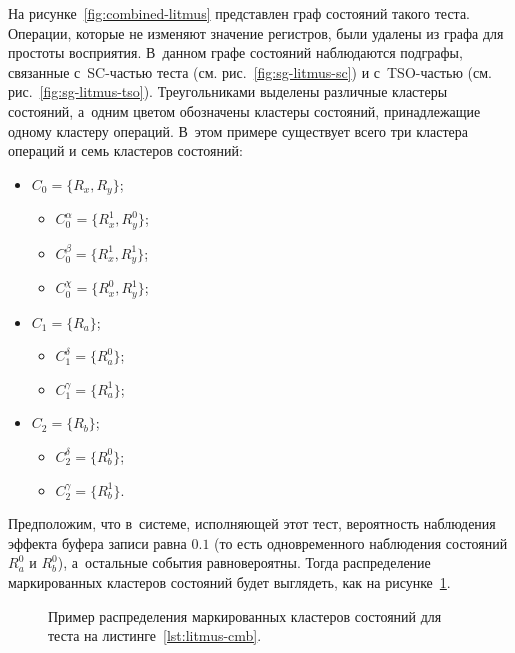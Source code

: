 На рисунке~\ref{fig:combined-litmus} представлен граф состояний
такого теста. Операции, которые не изменяют значение регистров, были
удалены из графа для простоты восприятия. В~данном графе состояний
наблюдаются подграфы, связанные с~SC-частью теста (см.
рис.~\ref{fig:sg-litmus-sc}) и с~TSO-частью (см.
рис.~\ref{fig:sg-litmus-tso}). Треугольниками выделены различные
кластеры состояний, а~одним цветом обозначены кластеры состояний,
принадлежащие одному кластеру операций. В~этом примере существует
всего три кластера операций и семь кластеров состояний:
\begin{samepage}
  \begin{itemize}
    \item $C_0 = \{R_x, R_y\}$;
      \begin{itemize}
        \item $C_0^{\alpha} = \{R_x^1, R_y^0\}$;
        \item $C_0^{\beta} = \{R_x^1, R_y^1\}$;
        \item $C_0^{\chi} = \{R_x^0, R_y^1\}$;
      \end{itemize}
    \item $C_1 = \{R_a\}$;
      \begin{itemize}
        \item $C_1^{\delta} = \{R_a^0\}$;
        \item $C_1^{\gamma} = \{R_a^1\}$;
      \end{itemize}
    \item $C_2 = \{R_b\}$;
      \begin{itemize}
        \item $C_2^{\delta} = \{R_b^0\}$;
        \item $C_2^{\gamma} = \{R_b^1\}$.
      \end{itemize}
  \end{itemize}
\end{samepage}

Предположим, что в~системе, исполняющей этот тест, вероятность
наблюдения эффекта буфера записи равна $0.1$ (то есть одновременного
наблюдения состояний $R_a^0$ и $R_b^0$), а~остальные события
равновероятны. Тогда распределение маркированных кластеров состояний
будет выглядеть, как на рисунке~\ref{fig:cluster-dist}.

\begin{figure}[ht]
  \centerfloat{
    \resizebox{\textwidth}{!}{}
  }
  \caption{Пример распределения маркированных кластеров состояний для
  теста на листинге~\ref{lst:litmus-cmb}.}
  \label{fig:cluster-dist}
\end{figure}


